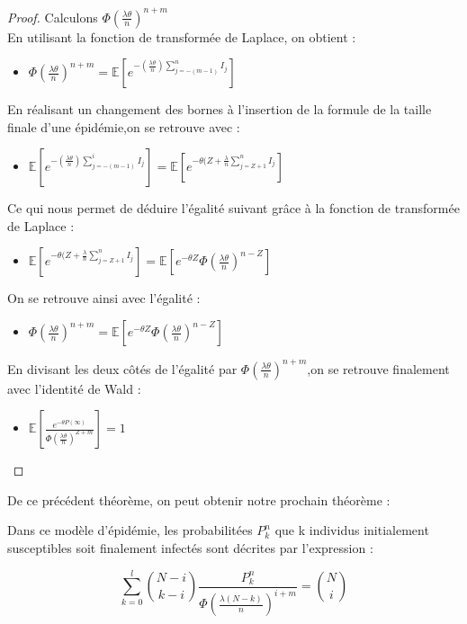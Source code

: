 \begin{proof}
Calculons $ \Phi( \frac{\lambda \theta}{n})^{n + m}$\\

En utilisant la fonction de transformée de Laplace, on obtient :
	\begin{itemize}[label=$\bullet$]
	\item $ \Phi( \frac{\lambda \theta}{n})^{n + m} = \mathbb{E}[e^{-(\frac{\lambda \theta}{n}) \sum^n_{j = - (m-1)} I_j }]$
	\end{itemize}
En réalisant un changement des bornes à l'insertion de la formule de la taille finale d'une épidémie,on se retrouve avec :
	\begin{itemize}[label=$\bullet$]
	\item  $ \mathbb{E}[e^{-(\frac{\lambda \theta}{n}) \sum^i_{j = - (m-1)} I_j }]= \mathbb{E}[e^{- \theta(Z+\frac{\lambda}{n} \sum^n_{j = Z+1} I_j }]$
	\end{itemize}
Ce qui nous permet de déduire l'égalité suivant grâce à la fonction de transformée de Laplace :
	\begin{itemize}[label=$\bullet$]
	\item $\mathbb{E}[e^{- \theta(Z+\frac{\lambda}{n} \sum^n_{j = Z+1} I_j }]=\mathbb{E}[e^{- \theta Z}\Phi( \frac{\lambda \theta}{n})^{n - Z}]$
	\end{itemize}	
On se retrouve ainsi avec l'égalité :	
	\begin{itemize}[label=$\bullet$]
	\item $\Phi( \frac{\lambda \theta}{n})^{n + m} =\mathbb{E}[e^{- \theta Z}\Phi( \frac{\lambda \theta}{n})^{n - Z}] $
	\end{itemize}
En divisant les deux côtés de l'égalité par $\Phi( \frac{\lambda \theta}{n})^{n + m}$,on se retrouve finalement avec l'identité de Wald :
	\begin{itemize}[label=$\bullet$]
	\item $\mathbb{E}[ \frac{ e^{-\theta P(\infty)} }{ \Phi( \frac{\lambda \theta}{n})^{Z + m} } ] = 1$
	\end{itemize}	
\end{proof}

De ce précédent théorème, on peut obtenir notre prochain théorème :
\begin{theorem}
Dans ce modèle d'épidémie, les probabilitées $P_{k}^{n}$ que k individus initialement susceptibles soit finalement infectés sont décrites par l'expression :

$$\sum_{k=0}^{l}\binom{N-i}{k-i}\frac{P_{k}^{n}}{\Phi( \frac{\lambda (N-k)}{n})^{i + m} }=\binom{N}{i}$$
\end{theorem}


